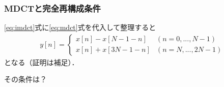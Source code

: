 \documentclass[14pt,xcolor=dvipsnames,table,dvipdfmx]{beamer}
\begin{document}
\begin{frame}[c]
    \frametitle{MDCTと完全再構成条件}
    \eqref{eq:imdct}式に\eqref{eq:mdct}式を代入して整理すると
    \begin{align}
        y[n] =
        \left\{ \begin{array}{ll}
            x[n] - x[N - 1 - n] & (n = 0, ..., N - 1) \\
            x[n] + x[3N - 1 - n] & (n = N, ..., 2N - 1)
        \end{array} \right. \label{eq:mdct_reconstruction}
    \end{align}
    となる（証明は補足）．
    \begin{block}{}
        その条件は？
    \end{block}
\end{frame}
\end{document}
